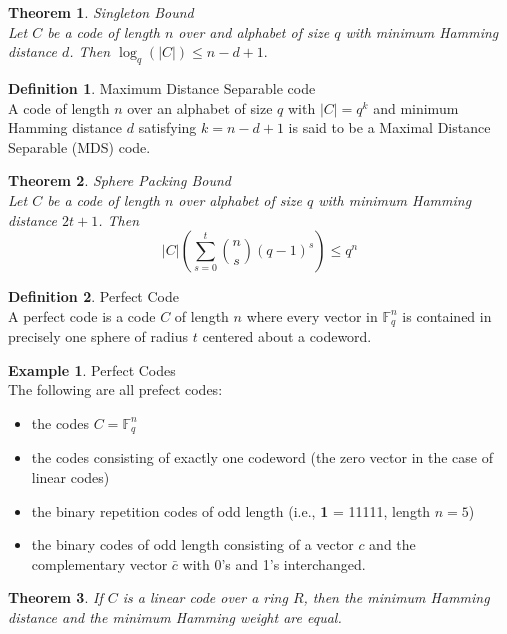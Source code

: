 \documentclass{article}
\newcommand{\F}{\mathbb{F}}
\newtheorem{theorem}{Theorem}
\theoremstyle{definition}
\newtheorem{definition}{Definition}
\newtheorem{example}{Example}
\begin{document}
\begin{theorem}{Singleton Bound}\\
  Let $C$ be a code of length $n$ over and alphabet of size $q$ with minimum Hamming distance $d$. Then $\log_q(|C|) \leq n-d+1.$
\end{theorem}

\begin{definition}{Maximum Distance Separable code}\\
  A code of length $n$ over an alphabet of size $q$ with $|C| = q^k$ and minimum Hamming distance $d$ satisfying $k=n-d+1$ is said to be a Maximal Distance Separable (MDS) code.
\end{definition}

\begin{theorem}{Sphere Packing Bound}\\
  Let $C$ be a code of length $n$ over alphabet of size $q$ with minimum Hamming distance $2t+1$. Then
  \[|C|\left(\sum_{s=0}^t {n \choose s}(q-1)^s\right)\leq q^n\]
\end{theorem}

\begin{definition}{Perfect Code}\\
  A perfect code is a code $C$ of length $n$ where every vector in $\F_q^n$ is contained in precisely one sphere of radius $t$ centered about a codeword.
\end{definition}

\begin{example}{Perfect Codes}\\
  The following are all prefect codes:
  \begin{itemize}
    \item the codes $C = \F_q^n$
    \item the codes consisting of exactly one codeword (the zero vector in the case of linear codes)
    \item the binary repetition codes of odd length (i.e., \textbf{1} = 11111, length $n=5$)
    \item the binary codes of odd length consisting of a vector $c$ and the complementary vector $\bar{c}$ with 0's and 1's interchanged.
  \end{itemize}
\end{example}

\begin{theorem}
  If $C$ is a linear code over a ring $R$, then the minimum Hamming distance and the minimum Hamming weight are equal.
\end{theorem}
\end{document}
